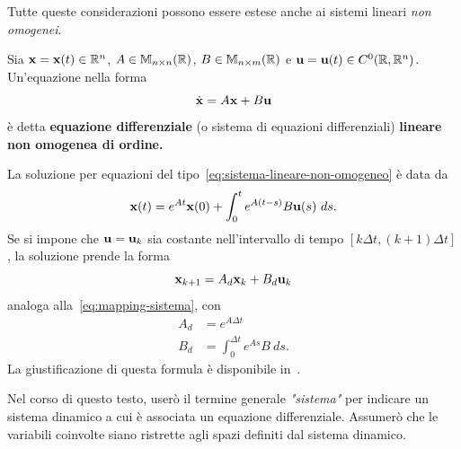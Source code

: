 Tutte queste considerazioni possono essere estese anche ai sistemi lineari
\emph{non omogenei}.

\begin{definition}
    Sia $\mathbf{x} = \mathbf{x}(t) \in \mathbb{R}^n$, $A \in \mathbb{M}_{n\times n}(\mathbb{R})$, $B \in \mathbb{M}_{n\times m}(\mathbb{R})$ e $\mathbf{u} = \mathbf{u}(t) \in C^0(\mathbb{R}, \mathbb{R}^n)$.
    Un'equazione nella forma
    \begin{equation}
        \dot{\mathbf{x}} = A \mathbf{x} + B \mathbf{u}
        \label{eq:sistema-lineare-non-omogeneo}
    \end{equation}
    è detta \textbf{equazione differenziale} (o sistema di equazioni differenziali) \textbf{lineare non omogenea di  ordine.}
    \label{def:sistema-lineare-non-omogeneo}
\end{definition}

La soluzione per equazioni del tipo~\eqref{eq:sistema-lineare-non-omogeneo} è data da
\begin{equation}
    \mathbf{x}(t) = e^{At} \mathbf{x}(0) + \int_{0}^{t} e^{A(t-s)} B \mathbf{u}(s) \ ds.
    \label{eq:soluzione-lineare-non-omogeneo}
\end{equation}
Se si impone che $\mathbf{u} = \mathbf{u}_k$ sia costante nell'intervallo di tempo $[k \Delta t, (k + 1)\Delta t]$,
la soluzione prende la forma
\begin{equation*}
    \mathbf{x}_{k+1} = A_d \mathbf{x}_k + B_d \mathbf{u}_k
\end{equation*}
analoga alla~\eqref{eq:mapping-sistema}, con
\begin{equation}
    \begin{aligned}
        A_d &= e^{A\Delta t} \\
        B_d &= \int_0^{\Delta t}e^{As} B\ ds.
    \end{aligned}
    \label{eq:bdequalsint}
\end{equation}
La giustificazione di questa formula è disponibile in~\cite{KAZANTZIS1999763}.

Nel corso di questo testo, userò il termine generale \emph{"sistema"} per indicare
un sistema dinamico a cui è associata un equazione differenziale.
Assumerò che le variabili
coinvolte siano ristrette agli spazi definiti dal sistema dinamico.


